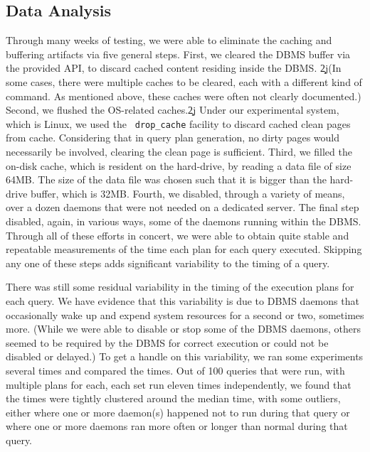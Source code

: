 
\subsection{Data Analysis}\label{sec:dataanalysis}
Through many weeks of testing, we were able to eliminate the caching and
buffering artifacts via five general steps.  First, we cleared the DBMS
buffer via the provided API, to discard cached content residing inside
the DBMS. \c2j{}{(In some cases, there were multiple caches to be cleared, each
with a different kind of command. As mentioned above, these caches were
often not clearly documented.) }Second, we flushed the OS-related
caches.\c2j{}{ Under our experimental system, which is Linux, we used the {\tt
  drop\_cache} facility to discard cached clean pages from
cache. Considering that in query plan generation, no dirty pages would
necessarily be involved, clearing the clean page is sufficient.} Third, we
filled the on-disk cache, which is resident on the hard-drive, by reading a
data file of size 64MB. The size of the data file was chosen such that it is
bigger than the hard-drive buffer, which is 32MB. Fourth, we disabled,
through a variety of means, over a
dozen daemons that were not needed on a dedicated server. The final step
disabled, again, in various ways, some of the daemons running within the DBMS.
Through all of these
efforts in concert, we were able to obtain quite stable and repeatable
measurements of the time each plan for each query executed. Skipping any
one of these steps adds significant variability to the timing of a query.

There was still some residual variability in the timing of the execution
plans for each query. We have evidence that this variability is due to DBMS
daemons that occasionally wake up and expend system resources for a second
or two, sometimes more. (While we were able to disable or stop some of the
DBMS daemons, others seemed to be required by the DBMS for correct execution or
could not be disabled or delayed.) To get a handle on this variability, we ran some
experiments several times and compared the times.  Out of 100 queries that
were run, with multiple plans for each, each set run eleven times
independently, we found that the times were tightly clustered around the
median time, with some outliers, either where one or more daemon(s) happened
not to run during that query or where one or more daemons ran more often or
longer than normal during that query.

